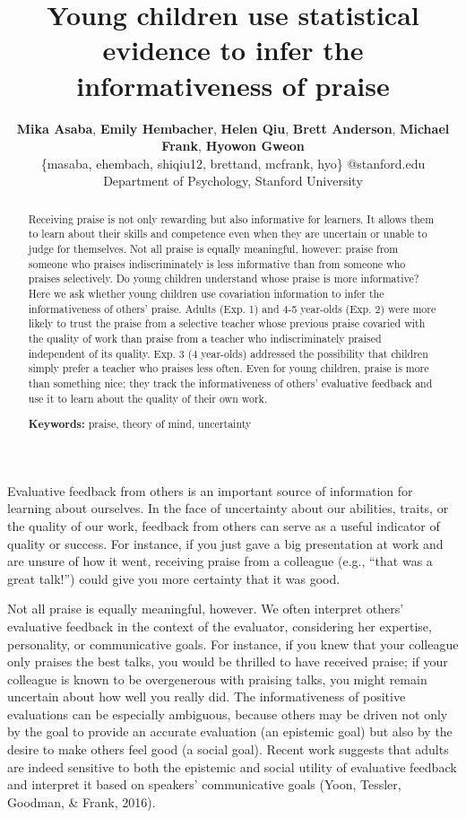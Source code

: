 \documentclass[10pt, letterpaper]{article}
\title{Young children use statistical evidence to infer the informativeness of
praise}
\author{{\large \bf Mika Asaba},  {\large \bf Emily Hembacher}, {\large \bf Helen Qiu}, {\large \bf Brett Anderson}, {\large \bf Michael Frank}, {\large \bf Hyowon Gweon} \\ \{masaba, ehembach, shiqiu12, brettand, mcfrank, hyo\} @stanford.edu \\ Department of Psychology, Stanford University}
\begin{document}
\maketitle

\begin{abstract}
Receiving praise is not only rewarding but also informative for
learners. It allows them to learn about their skills and competence even
when they are uncertain or unable to judge for themselves. Not all
praise is equally meaningful, however: praise from someone who praises
indiscriminately is less informative than from someone who praises
selectively. Do young children understand whose praise is more
informative? Here we ask whether young children use covariation
information to infer the informativeness of others' praise. Adults (Exp.
1) and 4-5 year-olds (Exp. 2) were more likely to trust the praise from
a selective teacher whose previous praise covaried with the quality of
work than praise from a teacher who indiscriminately praised independent
of its quality. Exp. 3 (4 year-olds) addressed the possibility that
children simply prefer a teacher who praises less often. Even for young
children, praise is more than something nice; they track the
informativeness of others' evaluative feedback and use it to learn about
the quality of their own work.

\textbf{Keywords:}
praise, theory of mind, uncertainty
\end{abstract}

Evaluative feedback from others is an important source of information
for learning about ourselves. In the face of uncertainty about our
abilities, traits, or the quality of our work, feedback from others can
serve as a useful indicator of quality or success. For instance, if you
just gave a big presentation at work and are unsure of how it went,
receiving praise from a colleague (e.g., ``that was a great talk!'')
could give you more certainty that it was good.

Not all praise is equally meaningful, however. We often interpret
others' evaluative feedback in the context of the evaluator, considering
her expertise, personality, or communicative goals. For instance, if you
knew that your colleague only praises the best talks, you would be
thrilled to have received praise; if your colleague is known to be
overgenerous with praising talks, you might remain uncertain about how
well you really did. The informativeness of positive evaluations can be
especially ambiguous, because others may be driven not only by the goal
to provide an accurate evaluation (an epistemic goal) but also by the
desire to make others feel good (a social goal). Recent work suggests
that adults are indeed sensitive to both the epistemic and social
utility of evaluative feedback and interpret it based on speakers'
communicative goals (Yoon, Tessler, Goodman, \& Frank, 2016).
\end{document}
